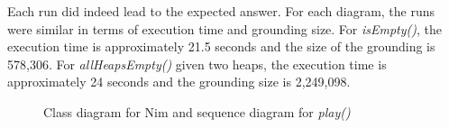 \documentclass[conference]{IEEEtran}
\begin{document}
Each run did indeed lead to the expected answer. For each diagram, the runs were similar in terms of execution time and grounding size. For \textit{isEmpty()}, the execution time is approximately 21.5 seconds and the size of the grounding is 578,306. For \textit{allHeapsEmpty()} given two heaps, the execution time is approximately 24 seconds and the grounding size is 2,249,098.

\begin{figure}[!t]
	\centering
	\hfil
		\label{fig:play}
	\caption{Class diagram for Nim and sequence diagram for \textit{play()}}
	\label{fig:nim-cd-play}
\end{figure}
\end{document}
